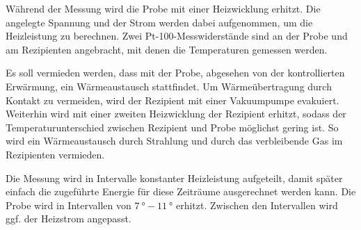 Während der Messung wird die Probe mit einer Heizwicklung erhitzt.
Die angelegte Spannung und der Strom werden dabei aufgenommen, um die Heizleistung zu berechnen.
Zwei Pt-100-Messwiderstände sind an der Probe und am Rezipienten angebracht, mit denen die Temperaturen gemessen werden.

Es soll vermieden werden, dass mit der Probe, abgesehen von der kontrollierten Erwärmung, ein Wärmeaustausch stattfindet.
Um Wärmeübertragung durch Kontakt zu vermeiden, wird der Rezipient mit einer Vakuumpumpe evakuiert.
Weiterhin wird mit einer zweiten Heizwicklung der Rezipient erhitzt, sodass der Temperaturunterschied zwischen Rezipient und Probe möglichst gering ist.
So wird ein Wärmeaustausch durch Strahlung und durch das verbleibende Gas im Rezipienten vermieden.

Die Messung wird in Intervalle konstanter Heizleistung aufgeteilt, damit später einfach die zugeführte Energie für diese Zeiträume ausgerechnet werden kann.
Die Probe wird in Intervallen von $\SI{7}{\degree} - \SI{11}{\degree}$ erhitzt.
Zwischen den Intervallen wird ggf. der Heizstrom angepasst.